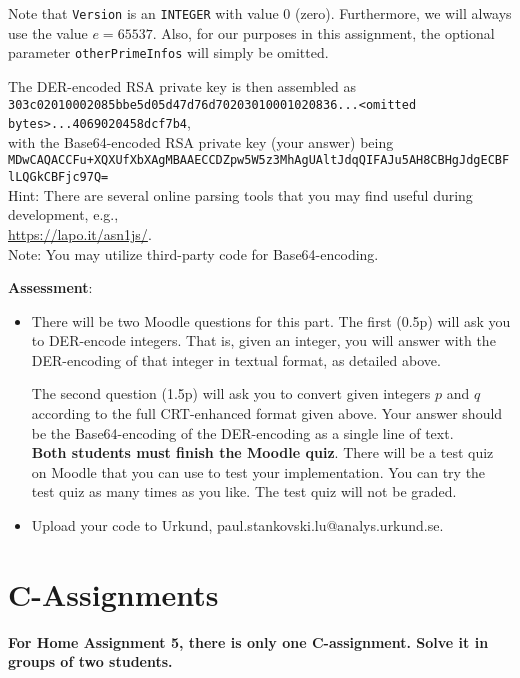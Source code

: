 \documentclass{article}
\begin{document}
\begin{description}
{Note that \verb!Version! is an \verb!INTEGER! with value $0$ (zero). Furthermore, we will always use the value $e=65537$. Also, for our purposes in this assignment, the optional parameter \verb!otherPrimeInfos! will simply be omitted.

The DER-encoded RSA private key is then assembled as\\

\verb!303c02010002085bbe5d05d47d76d70203010001020836...<omitted bytes>...4069020458dcf7b4!,\\

with the Base64-encoded RSA private key (your answer) being\\

\verb!MDwCAQACCFu+XQXUfXbXAgMBAAECCDZpw5W5z3MhAgUAltJdqQIFAJu5AH8CBHgJdgECBFlLQGkCBFjc97Q=!\\

Hint: There are several online parsing tools that you may find useful during development, e.g.,\\ 
\url{https://lapo.it/asn1js/}.\\
Note: You may utilize third-party code for Base64-encoding.

    \textbf{Assessment}:
	\begin{itemize}
		\item There will be two Moodle questions for this part. The first (0.5p) will ask you to DER-encode integers. That is, given an integer, you will answer with the DER-encoding of that integer in textual format, as detailed above.

        The second question (1.5p) will ask you to convert given integers $p$ and $q$ according to the full CRT-enhanced format given above. Your answer should be the Base64-encoding of the DER-encoding as a single line of text.\\
\textbf{Both students must finish the Moodle quiz}.
        There will be a test quiz on Moodle that you can use to test your implementation. You can try the test quiz as many times as you like. The test quiz will not be graded.
  		\item Upload your code to Urkund, paul.stankovski.lu@analys.urkund.se.
	\end{itemize}
    }
\end{description}

\clearpage

\section*{C-Assignments}
\textbf{For Home Assignment 5, there is only one C-assignment. Solve it in groups of two students.}
\end{document}
